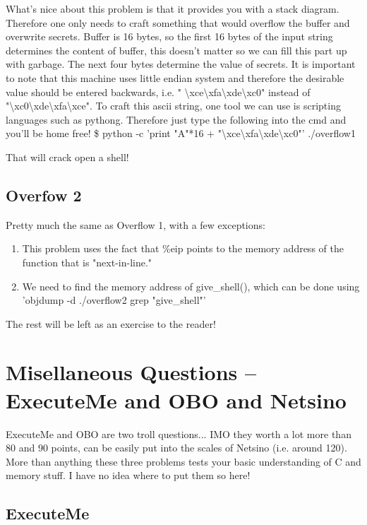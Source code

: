 \documentclass [12 pt, twoside] {article}
\begin{document}
What's nice about this problem is that it provides you with a stack diagram. Therefore
one only needs to craft something that would overflow the buffer and overwrite secrets.
Buffer is 16 bytes, so the first 16 bytes of the input string determines the content of
buffer, this doesn't matter so we can fill this part up with garbage. The next four bytes
determine the value of secrets. It is important to note that this machine uses little
endian system and therefore the desirable value should be entered backwards, i.e. "	\textbackslash xce\textbackslash xfa\textbackslash xde\textbackslash xc0"
instead of "\textbackslash xc0\textbackslash xde\textbackslash xfa\textbackslash xce". To craft this ascii string, one tool we can use is scripting
languages such as pythong. Therefore just type the following into the cmd and you'll be home free!
\$ python -c 'print "A"*16 + "\textbackslash xce\textbackslash xfa\textbackslash xde\textbackslash xc0"' \textpipe ./overflow1


That will crack open a shell!
\subsection{Overfow 2}


Pretty much the same as Overflow 1, with a few exceptions:
\begin{enumerate}
	\item This problem uses the fact that \%eip points to the memory address of the function that is "next-in-line."
	\item We need to find the memory address of give\_shell(), which can be done using 'objdump -d ./overflow2 \textpipe grep "give\_shell"'
\end{enumerate}
The rest will be left as an exercise to the reader!


\section{Misellaneous Questions -- ExecuteMe and OBO and Netsino}


ExecuteMe and OBO are two troll questions... IMO they worth a lot more than 80 and 90 points,
can be easily put into the scales of Netsino (i.e. around 120).
More than anything these three problems tests your basic understanding of C and memory stuff.
I have no idea where to put them so here!

\subsection{ExecuteMe}
\end{document}
